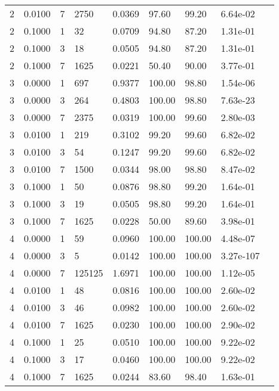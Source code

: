 \begin{longtable}{@{}lllllllll@{}}
2           & 0.0100 & 7   & 2750   & 0.0369 & 97.60   & 99.20   & 6.64e-02  &  \\
2           & 0.1000 & 1   & 32     & 0.0709 & 94.80   & 87.20   & 1.31e-01  &  \\
2           & 0.1000 & 3   & 18     & 0.0505 & 94.80   & 87.20   & 1.31e-01  &  \\
2           & 0.1000 & 7   & 1625   & 0.0221 & 50.40   & 90.00   & 3.77e-01  &  \\
3           & 0.0000 & 1   & 697    & 0.9377 & 100.00  & 98.80   & 1.54e-06  &  \\
3           & 0.0000 & 3   & 264    & 0.4803 & 100.00  & 98.80   & 7.63e-23  &  \\
3           & 0.0000 & 7   & 2375   & 0.0319 & 100.00  & 99.60   & 2.80e-03  &  \\
3           & 0.0100 & 1   & 219    & 0.3102 & 99.20   & 99.60   & 6.82e-02  &  \\
3           & 0.0100 & 3   & 54     & 0.1247 & 99.20   & 99.60   & 6.82e-02  &  \\
3           & 0.0100 & 7   & 1500   & 0.0344 & 98.00   & 98.80   & 8.47e-02  &  \\
3           & 0.1000 & 1   & 50     & 0.0876 & 98.80   & 99.20   & 1.64e-01  &  \\
3           & 0.1000 & 3   & 19     & 0.0505 & 98.80   & 99.20   & 1.64e-01  &  \\
3           & 0.1000 & 7   & 1625   & 0.0228 & 50.00   & 89.60   & 3.98e-01  &  \\
4           & 0.0000 & 1   & 59     & 0.0960 & 100.00  & 100.00  & 4.48e-07  &  \\
4           & 0.0000 & 3   & 5      & 0.0142 & 100.00  & 100.00  & 3.27e-107 &  \\
4           & 0.0000 & 7   & 125125 & 1.6971 & 100.00  & 100.00  & 1.12e-05  &  \\
4           & 0.0100 & 1   & 48     & 0.0816 & 100.00  & 100.00  & 2.60e-02  &  \\
4           & 0.0100 & 3   & 46     & 0.0982 & 100.00  & 100.00  & 2.60e-02  &  \\
4           & 0.0100 & 7   & 1625   & 0.0230 & 100.00  & 100.00  & 2.90e-02  &  \\
4           & 0.1000 & 1   & 25     & 0.0510 & 100.00  & 100.00  & 9.22e-02  &  \\
4           & 0.1000 & 3   & 17     & 0.0460 & 100.00  & 100.00  & 9.22e-02  &  \\
4           & 0.1000 & 7   & 1625   & 0.0244 & 83.60   & 98.40   & 1.63e-01  &  \\

\end{longtable}
